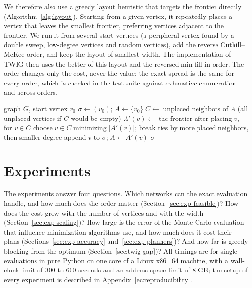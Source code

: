 \documentclass[11pt]{article}
\theoremstyle{definition}
\theoremstyle{remark}
\begin{document}
We therefore also use a greedy layout heuristic that targets the frontier directly (Algorithm~\ref{alg:layout}). Starting from a given vertex, it repeatedly places a vertex that leaves the smallest frontier, preferring vertices adjacent to the frontier. We run it from several start vertices (a peripheral vertex found by a double sweep, low-degree vertices and random vertices), add the reverse Cuthill--McKee order, and keep the layout of smallest width. The implementation of TWIG then uses the better of this layout and the reversed min-fill-in order. The order changes only the cost, never the value: the exact spread is the same for every order, which is checked in the test suite against exhaustive enumeration and across orders.

\begin{algorithm}[h]
\caption{Greedy frontier layout from a start vertex $v_0$}\label{alg:layout}
\begin{algorithmic}[1]
\Require graph $G$, start vertex $v_0$
\State $\sigma\gets(v_0)$; $A\gets\{v_0\}$ 
  \State $C\gets$ unplaced neighbors of $A$ (all unplaced vertices if $C$ would be empty)
  \State $A'(v)\gets$ the frontier after placing $v$, for $v\in C$
  \State choose $v\in C$ minimizing $|A'(v)|$; break ties by more placed neighbors, then smaller degree
  \State append $v$ to $\sigma$; $A\gets A'(v)$
\EndWhile
\State \Return $\sigma$
\end{algorithmic}
\end{algorithm}

\section{Experiments}\label{sec:twig-empirical}

The experiments answer four questions. Which networks can the exact evaluation handle, and how much does the order matter (Section~\ref{sec:exp-feasible})? How does the cost grow with the number of vertices and with the width (Section~\ref{sec:exp-scaling})? How large is the error of the Monte Carlo evaluation that influence minimization algorithms use, and how much does it cost their plans (Sections~\ref{sec:exp-accuracy} and~\ref{sec:exp-planners})? And how far is greedy blocking from the optimum (Section~\ref{sec:twig-gap})? All timings are for single evaluations in pure Python on one core of a Linux x86\_64 machine, with a wall-clock limit of $300$ to $600$ seconds and an address-space limit of $8$ GB; the setup of every experiment is described in Appendix~\ref{ec:reproducibility}.
\end{document}
